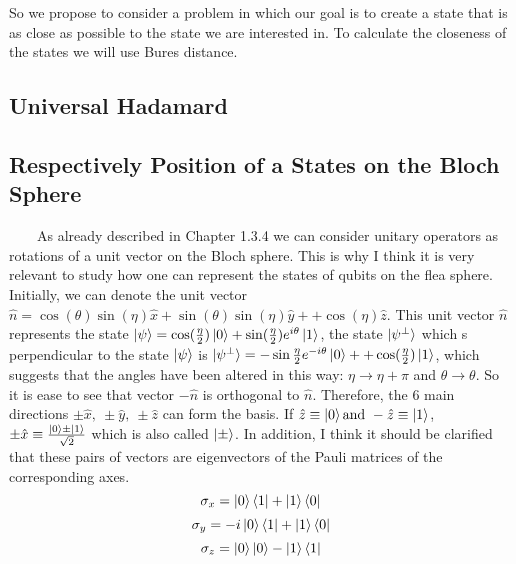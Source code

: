 \documentclass[english,14pt,a4paper]{article}
\begin{document}
	So we propose to consider a problem in which our goal is to create a state that is as close as possible to the state we are interested in. To calculate the closeness of the states we will use Bures distance.
	\subsection{Universal Hadamard}
	
	 
	\subsection{Respectively Position of a States on the Bloch Sphere}\ \ \ \
	As already described in Chapter 1.3.4 we can consider unitary operators as rotations of a unit vector on the Bloch sphere. This is why I think it is very relevant to study how one can represent the states of qubits on the flea sphere. \\
	
	Initially, we can denote the unit vector $\hat{n} = \cos(\theta)\sin(\eta) \hat{x} + \sin(\theta)\sin(\eta)\hat{y} + +\cos(\eta)\hat{z}$. This unit vector $\hat{n}$ represents the state $\ket{\psi} = \cos(\frac{\eta }{2})\ket{0} + \sin(\frac{\eta}{2}) e^{i\theta}\ket{1}$, the state $\ket{\psi^{\perp}}$ which s perpendicular to the state $\ket{\psi}$ is $\ket{\psi^{\perp}} = -\sin{\frac{\eta}{2}}e^{-i\theta} \ket{0} ++ \cos(\frac{\eta}{2})\ket{1}$, which suggests that the angles have been altered in this way: $ \eta \rightarrow \eta + \pi $ and $ \theta \rightarrow \theta$. So it is ease to see that vector $-\hat{n}$ is orthogonal to $\hat{n}$. Therefore, the 6 main directions $\pm \hat{x}, \ \pm \hat{y}, \ \pm \hat{z}$ can form the basis. If $\hat{z} \equiv \ket{0} \text{and} \ -\hat{z} \equiv \ket{1}$, $\pm \hat{x} \equiv \frac{\ket{0} \pm \ket{1}}{\sqrt{2}}$ which is also called $\ket{\pm}$. In addition, I think it should be clarified that these pairs of vectors are eigenvectors of the Pauli matrices of the corresponding axes. 
	\[
	\sigma_x = \ket{0}\bra{1} + \ket{1}\bra{0}
	\]
	\[
	\sigma_y = -i\ket{0}\bra{1} + \ket{1}\bra{0}
	\]
	\[
	\sigma_z = \ket{0}\ket{0} - \ket{1}\bra{1}
	\]
	
\end{document}
